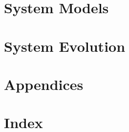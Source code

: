 \documentclass[letterpaper]{article}
\begin{document}
\section{System Models}
\pagebreak

\section{System Evolution}
\pagebreak

\section{Appendices}
\pagebreak

\section{Index}
\pagebreak
\end{document}
